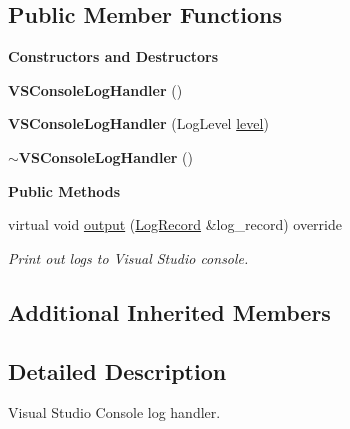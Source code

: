 \subsection*{Public Member Functions}
\begin{Indent}\textbf{ Constructors and Destructors}\par
\begin{DoxyCompactItemize}
\item 
\mbox{\label{classrev_1_1_v_s_console_log_handler_adeb0277bc14b37fae0fe258309709087}} 
{\bfseries V\+S\+Console\+Log\+Handler} ()
\item 
\mbox{\label{classrev_1_1_v_s_console_log_handler_a72c1414cbcf3a1009495d87f7be64c02}} 
{\bfseries V\+S\+Console\+Log\+Handler} (Log\+Level \mbox{\hyperlink{classrev_1_1_abstract_log_handler_ab27fb35504e3aaa820c4e57f406893ea}{level}})
\item 
\mbox{\label{classrev_1_1_v_s_console_log_handler_af1540963c4b14463d595d8a415fd77f4}} 
{\bfseries $\sim$\+V\+S\+Console\+Log\+Handler} ()
\end{DoxyCompactItemize}
\end{Indent}
\begin{Indent}\textbf{ Public Methods}\par
\begin{DoxyCompactItemize}
\item 
virtual void \mbox{\hyperlink{classrev_1_1_v_s_console_log_handler_abfe9a50069f8bb12d43a00c7e5f541e8}{output}} (\mbox{\hyperlink{classrev_1_1_log_record}{Log\+Record}} \&log\+\_\+record) override
\begin{DoxyCompactList}\small\item\em Print out logs to Visual Studio console. \end{DoxyCompactList}\end{DoxyCompactItemize}
\end{Indent}
\subsection*{Additional Inherited Members}


\subsection{Detailed Description}
Visual Studio Console log handler. 

